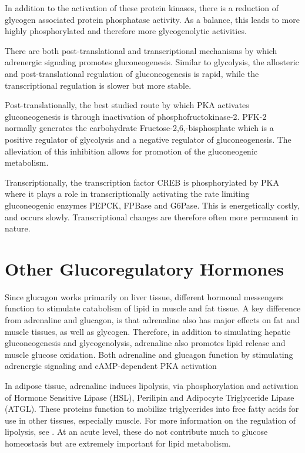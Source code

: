 \documentclass{tufte-handout}
\begin{document}
In addition to the activation of these protein kinases, there is a reduction of glycogen associated protein phosphatase activity.  As a balance, this leads to more highly phosphorylated and therefore more glycogenolytic activities.

  There are both post-translational and transcriptional mechanisms by which adrenergic signaling promotes gluconeogenesis.  Similar to glycolysis, the allosteric and post-translational regulation of gluconeogenesis is rapid, while the transcriptional regulation is slower but more stable.

Post-translationally, the best studied route by which PKA activates gluconeogenesis is through inactivation of phosphofructokinase-2.  PFK-2 normally generates the carbohydrate Fructose-2,6,-bisphosphate which is a positive regulator of glycolysis and a negative regulator of gluconeogenesis.  The alleviation of this inhibition allows for promotion of the gluconeogenic metabolism.  

Transcriptionally, the transcription factor CREB is phosphorylated by PKA where it plays a role in transcriptionally activating the rate limiting gluconeogenic enzymes PEPCK, FPBase and G6Pase.  This is energetically costly, and occurs slowly.  Transcriptional changes are therefore often more permanent in nature.

\section{Other Glucoregulatory Hormones}

Since glucagon works primarily on liver tissue, different hormonal messengers function to stimulate catabolism of lipid in muscle and fat tissue.  A key difference from adrenaline and glucagon, is that adrenaline also has major effects on fat and muscle tissues, as well as glycogen.  Therefore, in addition to simulating hepatic gluconeogenesis and glycogenolysis, adrenaline also promotes lipid release and muscle glucose oxidation.  Both adrenaline and glucagon function by stimulating adrenergic signaling and cAMP-dependent PKA activation

In adipose tissue, adrenaline induces lipolysis, via phosphorylation and activation of Hormone Sensitive Lipase (HSL), Perilipin and Adipocyte Triglyceride Lipase (ATGL).  These proteins function to mobilize triglycerides into free fatty acids for use in other tissues, especially muscle.  For more information on the regulation of lipolysis, see \cite{Young2013}.  At an acute level, these do not contribute much to glucose homeostasis but are extremely important for lipid metabolism.
\end{document}
